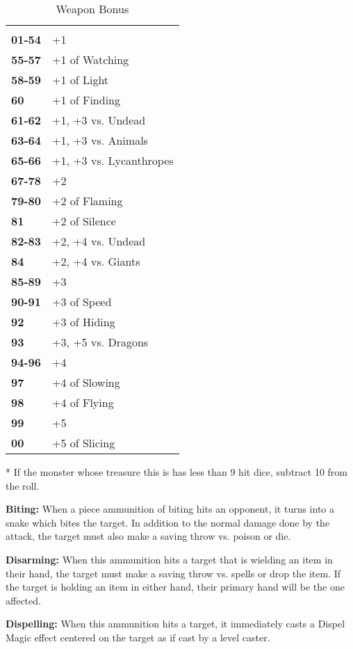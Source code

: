 \begin{multicols*}{2}
\begin {table}[H]
  \caption{Weapon Bonus}\label{tab:Weapon Bonus}
  \begin{tabularx}{\columnwidth}{>{\bfseries}YY}
	 & \\
	01-54 & +1\\
	55-57 & +1 of Watching\\
	58-59 & +1 of Light\\
	60 & +1 of Finding\\
	61-62 & +1, +3 vs. Undead\\
	63-64 & +1, +3 vs. Animals\\
	65-66 & +1, +3 vs. Lycanthropes\\
	67-78 & +2\\
	79-80 & +2 of Flaming\\
	81 & +2 of Silence\\
	82-83 & +2, +4 vs. Undead\\
	84 & +2, +4 vs. Giants\\
	85-89 & +3\\
	90-91 & +3 of Speed\\
	92 & +3 of Hiding\\
	93 & +3, +5 vs. Dragons\\
	94-96 & +4\\
	97 & +4 of Slowing\\
	98 & +4 of Flying\\
	99 & +5\\
	00 & +5 of Slicing\
  \end {tabularx}
	* If the monster whose treasure this is has less than 9 hit dice, subtract 10 from the roll.
\end {table}

\textbf{Biting:} When a piece ammunition of biting hits an opponent, it turns into a snake which bites the target. In addition to the normal damage done by the attack, the target must also make a saving throw vs. poison or die.

\textbf{Disarming:} When this ammunition hits a target that is wielding an item in their hand, the target must make a saving throw vs. spells or drop the item. If the target is holding an item in either hand, their primary hand will be the one affected.

\textbf{Dispelling:} When this ammunition hits a target, it immediately casts a Dispel Magic effect centered on the target as if cast by a  level caster.


\end{multicols*}
